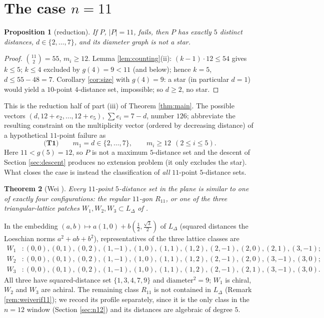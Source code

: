 \documentclass[11pt]{article}
\newtheorem{theorem}{Theorem}[section]
\newtheorem{proposition}[theorem]{Proposition}
\theoremstyle{definition}
\theoremstyle{remark}
\newcommand{\Lat}{L_{\Delta}}
\begin{document}
\section{The case $n = 11$}\label{sec:n11}

\begin{proposition}[reduction]\label{prop:n11red}
If $P$, $|P| = 11$, fails, then $P$ has exactly $5$ distinct distances,
$d \in \{2, \dots, 7\}$, and its diameter graph is not a star.
\end{proposition}

\begin{proof}
$\binom{11}{2} = 55$, $m_i \ge 12$. Lemma \ref{lem:counting}(ii): $(k-1) \cdot 12 \le 54$
gives $k \le 5$; $k \le 4$ excluded by $g(4) = 9 < 11$ (and below); hence $k = 5$,
$d \le 55 - 48 = 7$. Corollary \ref{cor:size} with $g(4) = 9$: a star (in particular
$d = 1$) would yield a $10$-point $4$-distance set, impossible; so $d \ge 2$, no star.
\end{proof}

This is the reduction half of part (iii) of Theorem \ref{thm:main}. The possible vectors
$(d, 12+e_2, \dots, 12+e_5)$, $\sum e_i = 7 - d$, number $126$; abbreviate the resulting
constraint on the multiplicity vector (ordered by decreasing distance) of a hypothetical
$11$-point failure as
\[
\textbf{(T1)}\qquad m_1 = d \in \{2, \dots, 7\}, \qquad m_i \ge 12 \ \ (2 \le i \le 5).
\]
Here $11 < g(5) = 12$, so $P$ is not a maximum $5$-distance set and the descent of Section
\ref{sec:descent} produces no extension problem (it only excludes the star). What closes
the case is instead the classification of \emph{all} $11$-point $5$-distance sets.

\begin{theorem}[{Wei \cite[Theorem~13, p.~514]{Wei11}}]\label{thm:e115}
Every $11$-point $5$-distance set in the plane is similar to one of exactly four
configurations: the regular $11$-gon $R_{11}$, or one of the three triangular-lattice
patches $W_1, W_2, W_3 \subset \Lat$ of \cite[Figure~4, p.~515]{Wei11}.
\end{theorem}

In the embedding $(a,b) \mapsto a(1,0) + b(\tfrac12, \tfrac{\sqrt3}{2})$ of $\Lat$ (squared
distances the Loeschian norms $a^2+ab+b^2$), representatives of the three lattice classes
are
\begin{align*}
W_1 &: (0,0),(0,1),(0,2),(1,-1),(1,0),(1,1),(1,2),(2,-1),(2,0),(2,1),(3,-1); \\
W_2 &: (0,0),(0,1),(0,2),(1,-1),(1,0),(1,1),(1,2),(2,-1),(2,0),(3,-1),(3,0); \\
W_3 &: (0,0),(0,1),(0,2),(1,-1),(1,0),(1,1),(1,2),(2,-1),(2,1),(3,-1),(3,0).
\end{align*}
All three have squared-distance set $\{1,3,4,7,9\}$ and diameter$^2 = 9$; $W_1$ is chiral,
$W_2$ and $W_3$ are achiral. The remaining class $R_{11}$ is not contained in $\Lat$
(Remark \ref{rem:weiverif11}); we record its profile separately, since it is the only
class in the $n = 12$ window (Section \ref{sec:n12}) and its distances are algebraic of
degree $5$.
\end{document}

